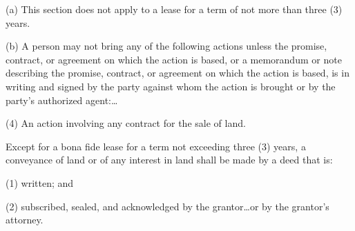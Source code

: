 

(a) This section does not apply to a lease for a term of not more than three (3)
years.

(b) A person may not bring any of the following actions unless the promise,
contract, or agreement on which the action is based, or a memorandum or note
describing the promise, contract, or agreement on which the action is based, is
in writing and signed by the party against whom the action is brought or by the
party's authorized agent:\dots

(4) An action involving any contract for the sale of land.


Except for a bona fide lease for a term not exceeding three (3) years, a
conveyance of land or of any interest in land shall be made by a deed that is:
\begin{statute}
\item (1) written; and

\item (2) subscribed, sealed, and acknowledged by the grantor\dots or by the
grantor's attorney.
\end{statute}

